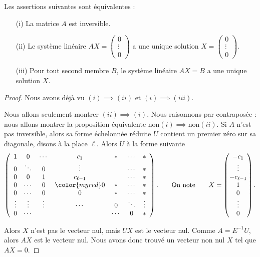 \documentclass[class=report,crop=false]{standalone}
\begin{document}
\begin{corollaire}
Les assertions suivantes sont équivalentes :
\begin{itemize}
  \item[(i)] La matrice $A$ est inversible.

  \item[(ii)] Le système linéaire $AX=\left(\begin{smallmatrix} 0 \\ \vdots \\ 0\end{smallmatrix}\right)$ a une unique solution
  $X=\left(\begin{smallmatrix} 0 \\ \vdots \\ 0\end{smallmatrix}\right)$.

  \item[(iii)] Pour tout second membre $B$, le système linéaire $AX=B$
  a une unique solution $X$.
\end{itemize}
\end{corollaire}

\begin{proof}
Nous avons déjà vu $(i)  \implies (ii)$ et
$(i) \implies (iii)$.

Nous allons seulement montrer $(ii) \implies (i)$.
Nous raisonnons par contraposée : nous allons montrer
la proposition équivalente $\text{non} (i) \implies \text{non} (ii)$.
Si $A$ n'est pas inversible, alors sa forme échelonnée réduite $U$ contient
un premier zéro sur sa diagonale, disons à la place $\ell$.
Alors $U$ à la forme suivante
\[\left( \begin{array}{ccccccc}
1 & 0 & \cdots & c_1 & * & \cdots& * \\
0& \ddots  & 0 &\vdots &&\cdots & * \\
0 & 0 & 1 & c_{\ell-1} && \cdots &* \\
0 & \cdots & 0 & {\color{myred}0} &*&\cdots &*\\
0 & \cdots & 0& 0& * & \cdots &*  \\
\vdots & \vdots & \vdots & \cdots &0&\ddots & \vdots \\
0& \cdots &&&\cdots&0&*
\end{array}\right).
\qquad \text{On note} \qquad
X = \begin{pmatrix} -c_1 \\ \vdots \\ -c_{\ell-1} \\ 1 \\ 0 \\ \vdots \\ 0 \end{pmatrix}.
\]

Alors $X$ n'est pas le vecteur nul, mais $UX$ est le vecteur nul.
Comme $A = E^{-1}U$, alors $AX$ est le vecteur nul. Nous avons donc trouvé
un vecteur non nul $X$ tel que $AX=0$.
\end{proof}
\end{document}
